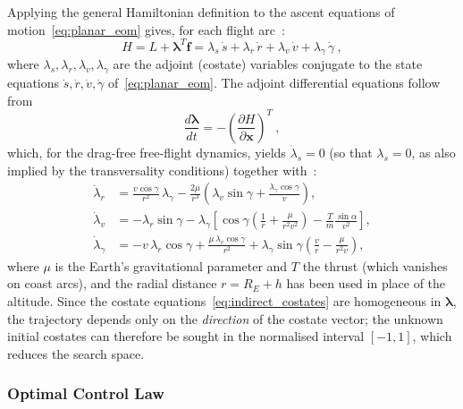 Applying the general Hamiltonian definition to the ascent equations of motion~\eqref{eq:planar_eom} gives, for each flight arc~\cite{BettsSurvey1998}:
\begin{equation}
H = L + \boldsymbol{\lambda}^{T}\mathbf{f}
  = \lambda_s\,\dot{s} + \lambda_r\,\dot{r} + \lambda_v\,\dot{v} + \lambda_\gamma\,\dot{\gamma} \ ,
\label{eq:indirect_hamiltonian}
\end{equation}
where $\lambda_s,\lambda_r,\lambda_v,\lambda_\gamma$ are the adjoint (costate) variables conjugate to the state equations $\dot{s},\dot{r},\dot{v},\dot{\gamma}$ of~\eqref{eq:planar_eom}. The adjoint differential equations follow from
\begin{equation}
\frac{d\boldsymbol{\lambda}}{dt} = -\left(\frac{\partial H}{\partial \mathbf{x}}\right)^{T} \ ,
\label{eq:indirect_adjoint}
\end{equation}
which, for the drag-free free-flight dynamics, yields $\dot{\lambda}_s = 0$ (so that $\lambda_s = 0$, as also implied by the transversality conditions) together with~\cite{pontryagin1987mathematical}:
\begin{subequations}\label{eq:indirect_costates}
\begin{align}
\dot{\lambda}_r &= \frac{v\cos\gamma}{r^{2}}\,\lambda_\gamma
  - \frac{2\mu}{r^{3}}\!\left(\lambda_v\sin\gamma + \frac{\lambda_\gamma\cos\gamma}{v}\right), \label{eq:costate_r}\\[4pt]
\dot{\lambda}_v &= -\lambda_r\sin\gamma
  - \lambda_\gamma\!\left[\cos\gamma\!\left(\frac{1}{r} + \frac{\mu}{r^{2}v^{2}}\right) - \frac{T}{m}\frac{\sin\alpha}{v^{2}}\right], \label{eq:costate_v}\\[4pt]
\dot{\lambda}_\gamma &= -v\,\lambda_r\cos\gamma
  + \frac{\mu\,\lambda_v\cos\gamma}{r^{2}}
  + \lambda_\gamma\sin\gamma\!\left(\frac{v}{r} - \frac{\mu}{r^{2}v}\right), \label{eq:costate_gamma}
\end{align}
\end{subequations}
where $\mu$ is the Earth's gravitational parameter and $T$ the thrust (which vanishes on coast arcs), and the radial distance $r = R_E + h$ has been used in place of the altitude. Since the costate equations~\eqref{eq:indirect_costates} are homogeneous in $\boldsymbol{\lambda}$, the trajectory depends only on the \emph{direction} of the costate vector; the unknown initial costates can therefore be sought in the normalised interval $[-1,1]$, which reduces the search space.

\subsubsection{Optimal Control Law}

